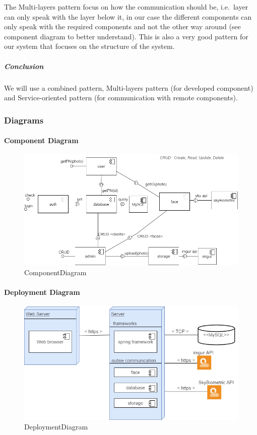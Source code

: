 \documentclass[a4paper,11pt]{article}
\begin{document}
The Multi-layers pattern focus on how the communication should be,
i.e.~layer can only speak with the layer below it, in our case the
different components can only speak with the required components and not
the other way around (see component diagram to better understand). This
is also a very good pattern for our system that focuses on the structure
of the system.

\subparagraph{Conclusion}\label{conclusion}

We will use a combined pattern, Multi-layers pattern (for developed
component) and Service-oriented pattern (for communication with remote
components).

\newpage

\subsubsection{Diagrams}\label{diagrams}

\paragraph{Component Diagram}\label{component-diagram}

\begin{figure}[ht!]
	\centering
	\includegraphics[width=150mm]{Architecture/ComponentDiagram.png}
	\caption{ComponentDiagram}
\end{figure}

\paragraph{Deployment Diagram}\label{deployment-diagram}

\begin{figure}[ht!]
	\centering
	\includegraphics[width=150mm]{Architecture/DeploymentDiagram.png}
	\caption{DeploymentDiagram}
\end{figure}
\newpage
\end{document}

